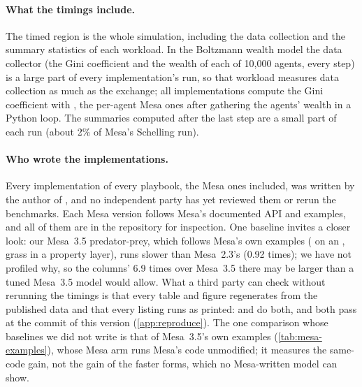 \paragraph{What the timings include.} The timed region is the whole simulation, including the
data collection and the summary statistics of each workload. In the Boltzmann wealth model the
data collector (the Gini coefficient and the wealth of each of 10,000 agents, every step) is a large part of every
implementation's run, so that workload measures data collection as much as the exchange; all
implementations compute the Gini coefficient with , the per-agent Mesa ones after
gathering the agents' wealth in a Python loop. The summaries computed after the last step are a
small part of each run (about 2\% of Mesa's Schelling run).

\paragraph{Who wrote the implementations.} Every implementation of every playbook, the Mesa ones
included, was written by the author of \modelly{}, and no independent party has yet
reviewed them or rerun the benchmarks. Each Mesa version follows Mesa's documented API and
examples, and all of them are in the repository for inspection. One baseline invites a closer look: our Mesa~3.5 predator-prey, which
follows Mesa's own examples ( on an , grass in a
property layer), runs slower than Mesa~2.3's (0.92 times); we have not profiled why, so the
columns' 6.9 times over Mesa~3.5 there may be larger than a tuned Mesa~3.5 model would allow. What a third party can check without rerunning the timings is
that every table and figure regenerates from the published data and that every listing
runs as printed:  and
 do both, and both pass at the commit of this
version (\cref{app:reproduce}). The one comparison whose
baselines we did not write is that of Mesa~3.5's own examples (\cref{tab:mesa-examples}),
whose Mesa arm runs Mesa's code unmodified; it measures the same-code gain, not the gain of the faster
forms, which no Mesa-written model can show.

